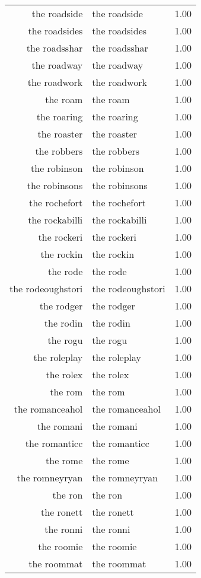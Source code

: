 \begin{table}[ht]
\begin{tabular}{rlr}
  the roadside & the roadside & 1.00 \\ 
  the roadsides & the roadsides & 1.00 \\ 
  the roadsshar & the roadsshar & 1.00 \\ 
  the roadway & the roadway & 1.00 \\ 
  the roadwork & the roadwork & 1.00 \\ 
  the roam & the roam & 1.00 \\ 
  the roaring & the roaring & 1.00 \\ 
  the roaster & the roaster & 1.00 \\ 
  the robbers & the robbers & 1.00 \\ 
  the robinson & the robinson & 1.00 \\ 
  the robinsons & the robinsons & 1.00 \\ 
  the rochefort & the rochefort & 1.00 \\ 
  the rockabilli & the rockabilli & 1.00 \\ 
  the rockeri & the rockeri & 1.00 \\ 
  the rockin & the rockin & 1.00 \\ 
  the rode & the rode & 1.00 \\ 
  the rodeoughstori & the rodeoughstori & 1.00 \\ 
  the rodger & the rodger & 1.00 \\ 
  the rodin & the rodin & 1.00 \\ 
  the rogu & the rogu & 1.00 \\ 
  the roleplay & the roleplay & 1.00 \\ 
  the rolex & the rolex & 1.00 \\ 
  the rom & the rom & 1.00 \\ 
  the romanceahol & the romanceahol & 1.00 \\ 
  the romani & the romani & 1.00 \\ 
  the romanticc & the romanticc & 1.00 \\ 
  the rome & the rome & 1.00 \\ 
  the romneyryan & the romneyryan & 1.00 \\ 
  the ron & the ron & 1.00 \\ 
  the ronett & the ronett & 1.00 \\ 
  the ronni & the ronni & 1.00 \\ 
  the roomie & the roomie & 1.00 \\ 
  the roommat & the roommat & 1.00 \\ 

\end{tabular}
\end{table}
